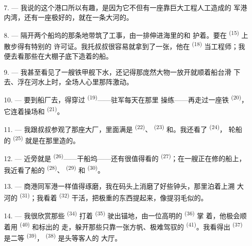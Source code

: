 \VUsaut{3.0mm}
\VUsaut{3.0mm}

7. --- 我说的这个港口所以有趣，是因为它不但有一座靠巨大工程人工造成的
军港内湾，还有一座极好的，就在一条大河的。

8. --- 隔开两个船坞的那条地带筑了工事，由一排伸进海里的和
护着。要在 \textsuperscript{(15)} 上散步得有特别的
许可证。我托叔叔很容易就拿到了一张，他在 \textsuperscript{(18)}
当工程师；我便去看那些在大棚子底下造着的船。

9. --- 我甚至看见了一艘铁甲舰下水，还记得那庞然大物一放开就顺着船台滑
下去、浮在河水上时，全场人心里那阵激动。

10. --- 要到船厂去，得穿过 \textsuperscript{(19)}——驻军每天在那里
操练——再走过一座铁 \textsuperscript{(20)}，
它连着操场和 \textsuperscript{(21)}。

\VUsaut{3.0mm}
\VUsaut{3.0mm}

11. --- 我跟叔叔参观了那座大厂，里面满是 \textsuperscript{(22)}、
 \textsuperscript{(23)} 和。我还看了 \textsuperscript{(24)}，
轮船的 \textsuperscript{(25)} 就是在那里造的。

12. --- 近旁就是 \textsuperscript{(26)}——干船坞——还有很值得看的
 \textsuperscript{(27)}；在一艘正在修的船上，我近看了船的
 \textsuperscript{(28)}、 \textsuperscript{(29)} 和
 \textsuperscript{(30)}。

13. --- 商港同军港一样值得琢磨，我在码头上消磨了好些钟头，那里泊着上溯
大河的 \textsuperscript{(31)}；我看着
\textsuperscript{(32)} 干活，把极重的东西提起来，像提羽毛似的。

\VUsaut{4.0mm}
\VUsaut{3.0mm}

14. --- 我很欣赏那些 \textsuperscript{(34)} 打着
\textsuperscript{(35)} 驶出锚地，由一位高明的 \textsuperscript{(36)} 掌
着，他极会顺着用 \textsuperscript{(40)} 和标出的
走，躲开那些只靠一张方帆、极难驾驭的
\textsuperscript{(41)}。我看得出 \textsuperscript{(37)} 是二等
 \textsuperscript{(39)}， \textsuperscript{(38)} 是头等客人的
大厅。

